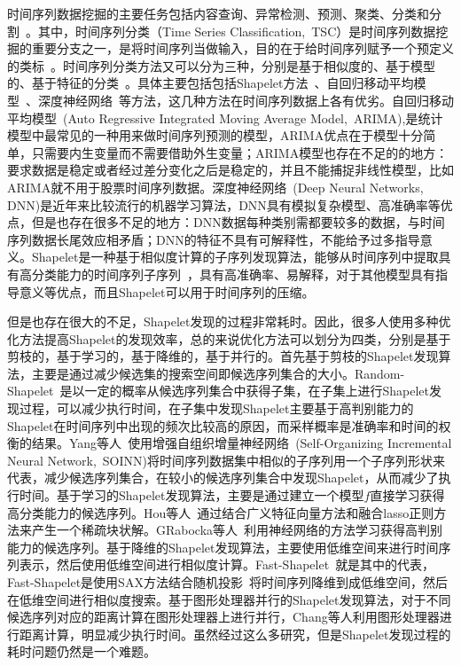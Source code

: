 时间序列数据挖掘的主要任务包括内容查询、异常检测、预测、聚类、分类和分割~\cite{esling2012time}。其中，时间序列分类（Time  Series Classification,~TSC）是时间序列数据挖掘的重要分支之一，是将时间序列当做输入，目的在于给时间序列赋予一个预定义的类标~\cite{wei2006semi}。时间序列分类方法又可以分为三种，分别是基于相似度的、基于模型的、基于特征的分类~\cite{xing2010brief,fakhrazarisurvey}。具体主要包括包括Shapelet方法~\cite{hills2014classification,mueen2011logical}、自回归移动平均模型~\cite{saboia1977autoregressive}、深度神经网络~\cite{wang2017time}等方法，这几种方法在时间序列数据上各有优劣。自回归移动平均模型~\cite{earnest2005using}(Auto Regressive Integrated Moving Average Model,~ARIMA),是统计模型中最常见的一种用来做时间序列预测的模型，ARIMA优点在于模型十分简单，只需要内生变量而不需要借助外生变量；ARIMA模型也存在不足的的地方：要求数据是稳定或者经过差分变化之后是稳定的，并且不能捕捉非线性模型，比如ARIMA就不用于股票时间序列数据。深度神经网络~\cite{zheng2014time}(Deep Neural Networks, DNN)是近年来比较流行的机器学习算法，DNN具有模拟复杂模型、高准确率等优点，但是也存在很多不足的地方：DNN数据每种类别需都要较多的数据，与时间序列数据长尾效应相矛盾；DNN的特征不具有可解释性，不能给予过多指导意义。Shapelet是一种基于相似度计算的子序列发现算法，能够从时间序列中提取具有高分类能力的时间序列子序列~\cite{hou2016efficient}，具有高准确率、易解释，对于其他模型具有指导意义等优点，而且Shapelet可以用于时间序列的压缩。

但是也存在很大的不足，Shapelet发现的过程非常耗时。因此，很多人使用多种优化方法提高Shapelet的发现效率，总的来说优化方法可以划分为四类，分别是基于剪枝的，基于学习的，基于降维的，基于并行的。首先基于剪枝的Shapelet发现算法，主要是通过减少候选集的搜索空间即候选序列集合的大小。Random-Shapelet~\cite{renard2015random}是以一定的概率从候选序列集合中获得子集，在子集上进行Shapelet发现过程，可以减少执行时间，在子集中发现Shapelet主要基于高判别能力的Shapelet在时间序列中出现的频次比较高的原因，而采样概率是准确率和时间的权衡的结果。Yang等人~\cite{yang2016shapelet}使用增强自组织增量神经网络~\cite{furao2007enhanced}(Self-Organizing Incremental Neural Network,~SOINN)将时间序列数据集中相似的子序列用一个子序列形状来代表，减少候选序列集合，在较小的候选序列集合中发现Shapelet，从而减少了执行时间。基于学习的Shapelet发现算法，主要是通过建立一个模型$f$直接学习获得高分类能力的候选序列。Hou等人~\cite{hou2016efficient}通过结合广义特征向量方法和融合lasso正则方法来产生一个稀疏块状解。GRabocka等人~\cite{grabocka2014learning}利用神经网络的方法学习获得高判别能力的候选序列。基于降维的Shapelet发现算法，主要使用低维空间来进行时间序列表示，然后使用低维空间进行相似度计算。Fast-Shapelet~\cite{rakthanmanon2013fast}就是其中的代表，Fast-Shapelet是使用SAX方法结合随机投影~\cite{lin2007experiencing}将时间序列降维到成低维空间，然后在低维空间进行相似度搜索。基于图形处理器并行的Shapelet发现算法，对于不同候选序列对应的距离计算在图形处理器上进行并行，Chang等人\cite{chang2012efficient}利用图形处理器进行距离计算，明显减少执行时间。虽然经过这么多研究，但是Shapelet发现过程的耗时问题仍然是一个难题。

